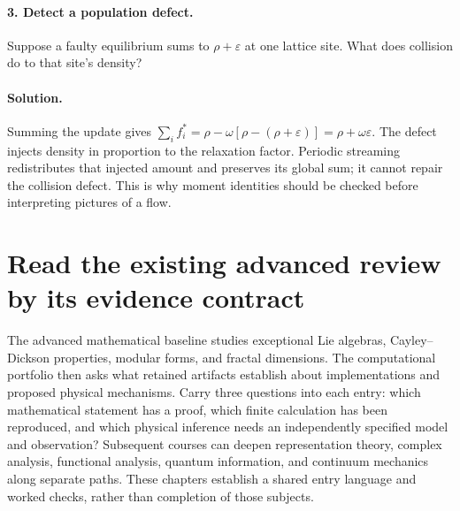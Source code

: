 \paragraph{3. Detect a population defect.}
Suppose a faulty equilibrium sums to $\rho+\varepsilon$ at one lattice
site. What does collision do to that site's density?

\paragraph{Solution.}
Summing the update gives
$\sum_i f_i^*=\rho-\omega[\rho-(\rho+\varepsilon)]
=\rho+\omega\varepsilon$.
The defect injects density in proportion to the relaxation factor. Periodic
streaming redistributes that injected amount and preserves its global sum;
it cannot repair the collision defect. This is why moment identities should
be checked before interpreting pictures of a flow.

\section{Read the existing advanced review by its evidence contract}
The advanced mathematical baseline studies exceptional Lie algebras,
Cayley--Dickson properties, modular forms, and fractal dimensions. The
computational portfolio then asks what retained artifacts establish about
implementations and proposed physical mechanisms. Carry three questions into
each entry: which mathematical statement has a proof, which finite calculation
has been reproduced, and which physical inference needs an independently
specified model and observation? Subsequent courses can deepen representation
theory, complex analysis, functional analysis, quantum information, and
continuum mechanics along separate paths. These chapters establish a shared
entry language and worked checks, rather than completion of those subjects.



